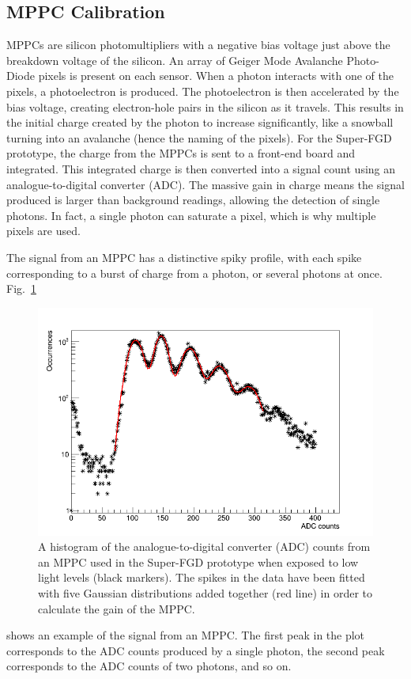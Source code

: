 \documentclass[aps,pra,12pt,notitlepage,tightenlines]{revtex4-1}
\begin{document}
\subsection{MPPC Calibration}
\label{sec:mppc}
MPPCs are silicon photomultipliers with a negative bias voltage just above the breakdown voltage of the silicon. An array of Geiger Mode Avalanche Photo-Diode pixels is present on each sensor. When a photon interacts with one of the pixels, a photoelectron is produced. The photoelectron is then accelerated by the bias voltage, creating electron-hole pairs in the silicon as it travels. This results in the initial charge created by the photon to increase significantly, like a snowball turning into an avalanche (hence the naming of the pixels). For the Super-FGD prototype, the charge from the MPPCs is sent to a front-end board and integrated. This integrated charge is then converted into a signal count using an analogue-to-digital converter (ADC). The massive gain in charge means the signal produced is larger than background readings, allowing the detection of single photons. In fact, a single photon can saturate a pixel, which is why multiple pixels are used.

The signal from an MPPC has a distinctive spiky profile, with each spike corresponding to a burst of charge from a photon, or several photons at once. Fig.\ \ref{fig:mppc}
\begin{figure}
 \includegraphics[scale=0.5]{MPPC}
 \caption{A histogram of the analogue-to-digital converter (ADC) counts from an MPPC used in the Super-FGD prototype when exposed to low light levels (black markers). The spikes in the data have been fitted with five Gaussian distributions added together (red line) in order to calculate the gain of the MPPC.}
 \label{fig:mppc}
\end{figure}
shows an example of the signal from an MPPC. The first peak in the plot corresponds to the ADC counts produced by a single photon, the second peak corresponds to the ADC counts of two photons, and so on. 
 
\end{document}
